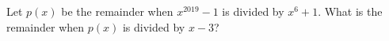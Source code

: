 Let $p(x)$ be the remainder when $x^{2019}-1$ is divided by $x^6+1$. What is the remainder when $p(x)$ is divided by $x-3$?
